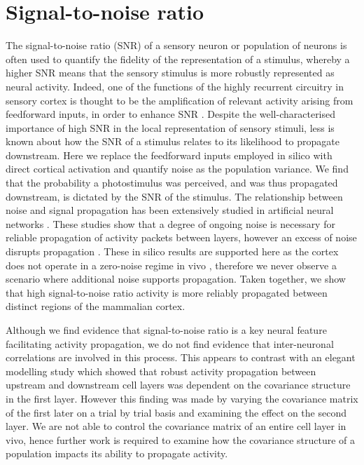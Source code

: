 \section{Signal-to-noise ratio}
The signal-to-noise ratio (SNR) of a sensory neuron \cite{barlow_three_1969} or population of neurons \cite{zohary_correlated_1994} is often used to quantify the fidelity of the representation of a stimulus, whereby a higher SNR means that the sensory stimulus is more robustly represented as neural activity. Indeed, one of the functions of the highly recurrent circuitry in sensory cortex is thought to be the amplification of relevant activity arising from feedforward inputs, in order to enhance SNR \cite{douglas_recurrent_1995-1, ganguli_one-dimensional_2008}. Despite the well-characterised importance of high SNR in the local representation of sensory stimuli, less is known about how the SNR of a stimulus relates to its likelihood to propagate downstream. Here we replace the feedforward inputs employed in silico with direct cortical activation and quantify noise as the population variance. We find that the probability a photostimulus was perceived, and was thus propagated downstream, is dictated by the SNR of the stimulus. The relationship between noise and signal propagation has been extensively studied in artificial neural networks \cite{vogels_signal_2005, diesmann_stable_1999, ozer_weak_2010, guo_signal_2011}. These studies show that a degree of ongoing noise is necessary for reliable propagation of activity packets between layers, however an excess of noise disrupts propagation \cite{guo_signal_2011}. These in silico results are supported here as the cortex does not operate in a zero-noise regime in vivo \cite{vreeswijk_chaotic_1998-1, faisal_noise_2008-1, anderson_contribution_2000, burns_spontaneous_1976, london_sensitivity_2010}, therefore we never observe a scenario where additional noise supports propagation. Taken together, we show that high signal-to-noise ratio activity is more reliably propagated between distinct regions of the mammalian cortex.

Although we find evidence that signal-to-noise ratio is a key neural feature facilitating activity propagation, we do not find evidence that inter-neuronal correlations are involved in this process. This appears to contrast with an elegant modelling study \cite{zylberberg_robust_2017} which showed that robust activity propagation between upstream and downstream cell layers was dependent on the covariance structure in the first layer. However this finding was made by varying the covariance matrix of the first later on a trial by trial basis and examining the effect on the second layer. We are not able to control the covariance matrix of an entire cell layer in vivo, hence further work is required to examine how the covariance structure of a population impacts its ability to propagate activity. 

